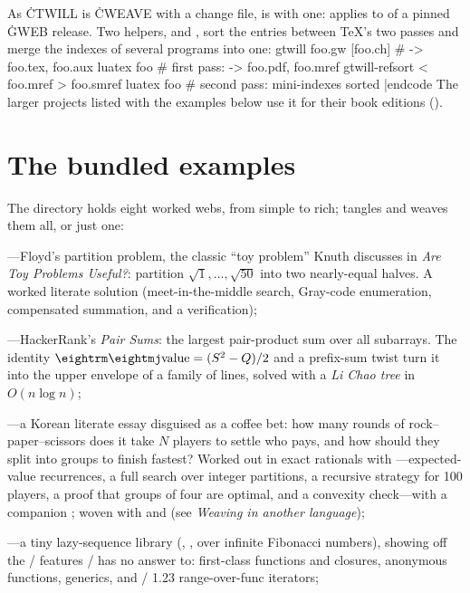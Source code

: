 As \.{CTWILL} is \.{CWEAVE} with a change file,  is  with
one:  applies to  of a pinned \.{GWEB}
release. Two helpers,  and , sort the entries
between \TeX's two passes and merge the indexes of several programs into one:
\begincode
gtwill foo.gw [foo.ch]          # -> foo.tex, foo.aux
luatex foo                      # first pass: -> foo.pdf, foo.mref
gtwill-refsort < foo.mref > foo.smref
luatex foo                      # second pass: mini-indexes sorted
|endcode
The larger projects listed with the examples below use it for their book
editions ().

\chapter{The bundled examples}
The  directory holds eight worked webs, from simple to rich;  tangles and weaves them all, or  just one:

\bull {}---Floyd's partition problem, the classic ``toy problem''
Knuth discusses in {\it Are Toy Problems Useful?}: partition
$\sqrt1,\ldots,\sqrt{50}$ into two nearly-equal halves. A worked literate
solution (meet-in-the-middle search, Gray-code enumeration, compensated
summation, and a  verification);

\bull {}---HackerRank's {\it Pair Sums\/}: the largest pair-product
sum over all subarrays. The identity ${\rm value} = (S^2-Q)/2$ and a prefix-sum
twist turn it into the upper envelope of a family of lines, solved with a
{\sl Li Chao tree\/} in $O(n\log n)$;

\bull {}---a Korean literate essay disguised as a coffee bet: how many
rounds of rock--paper--scissors does it take $N$ players to settle who pays,
and how should they split into groups to finish fastest? Worked out in exact
rationals with ---expected-value recurrences, a full search over
integer partitions, a recursive strategy for 100 players, a proof that groups
of four are optimal, and a convexity check---with a companion
; woven with  and  (see {\it Weaving
in another language\/});

\bull {}---a tiny lazy-sequence library (, ,
 over infinite Fibonacci numbers), showing off the \GO/ features
\CEE/ has no answer to: first-class functions and closures, anonymous
functions, generics, and \GO/ 1.23 range-over-func iterators;

